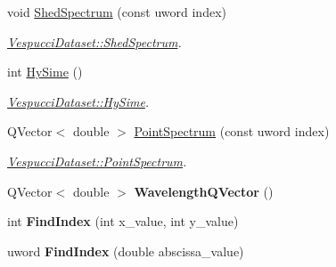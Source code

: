 \begin{DoxyCompactItemize}
\item 
void \hyperlink{class_vespucci_dataset_a3d199a68c6dfa8f609ed7eacdb3d1ec8}{Shed\+Spectrum} (const uword index)
\begin{DoxyCompactList}\small\item\em \hyperlink{class_vespucci_dataset_a3d199a68c6dfa8f609ed7eacdb3d1ec8}{Vespucci\+Dataset\+::\+Shed\+Spectrum}. \end{DoxyCompactList}\item 
int \hyperlink{class_vespucci_dataset_a7c685d41d2093602e563f7facaff7f9a}{Hy\+Sime} ()
\begin{DoxyCompactList}\small\item\em \hyperlink{class_vespucci_dataset_a7c685d41d2093602e563f7facaff7f9a}{Vespucci\+Dataset\+::\+Hy\+Sime}. \end{DoxyCompactList}\item 
Q\+Vector$<$ double $>$ \hyperlink{class_vespucci_dataset_a0d31db077798909a755ad505f060fedb}{Point\+Spectrum} (const uword index)
\begin{DoxyCompactList}\small\item\em \hyperlink{class_vespucci_dataset_a0d31db077798909a755ad505f060fedb}{Vespucci\+Dataset\+::\+Point\+Spectrum}. \end{DoxyCompactList}\item 
\hypertarget{class_vespucci_dataset_ac183c048438921d67865377c1533c49e}{Q\+Vector$<$ double $>$ {\bfseries Wavelength\+Q\+Vector} ()}\label{class_vespucci_dataset_ac183c048438921d67865377c1533c49e}

\item 
\hypertarget{class_vespucci_dataset_aa696f82f686c193e9d5cf5367c7932c9}{int {\bfseries Find\+Index} (int x\+\_\+value, int y\+\_\+value)}\label{class_vespucci_dataset_aa696f82f686c193e9d5cf5367c7932c9}

\item 
\hypertarget{class_vespucci_dataset_a21e40c0c1d04d0132168398f7ef3aad6}{uword {\bfseries Find\+Index} (double abscissa\+\_\+value)}\label{class_vespucci_dataset_a21e40c0c1d04d0132168398f7ef3aad6}


\end{DoxyCompactItemize}
